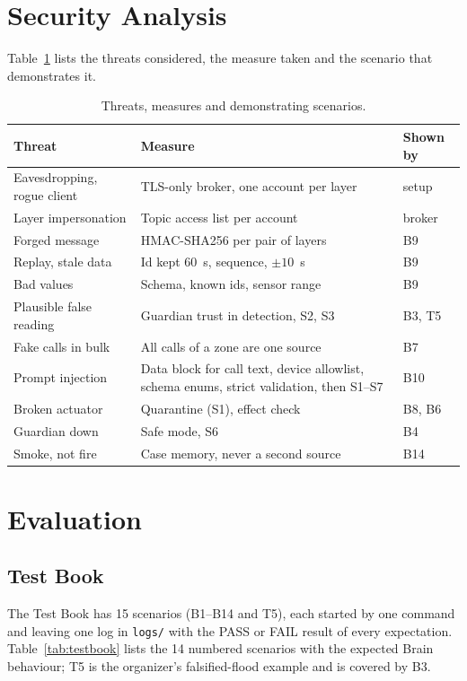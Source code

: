 \documentclass[conference]{IEEEtran}
\newcommand{\code}[1]{\texttt{\small #1}}
\begin{document}
\section{Security Analysis}
Table~\ref{tab:sec} lists the threats considered, the measure taken and the scenario that demonstrates it.

\begin{table}[t]
\centering
\caption{Threats, measures and demonstrating scenarios.}
\label{tab:sec}
\footnotesize
\renewcommand{\arraystretch}{1.05}
\begin{tabular}{@{}p{2.0cm} p{4.3cm} l@{}}
\toprule
\textbf{Threat} & \textbf{Measure} & \textbf{Shown by}\\
\midrule
Eavesdropping, rogue client & TLS-only broker, one account per layer & setup\\
Layer impersonation & Topic access list per account & broker\\
Forged message & HMAC-SHA256 per pair of layers & B9\\
Replay, stale data & Id kept 60~s, sequence, $\pm10$~s & B9\\
Bad values & Schema, known ids, sensor range & B9\\
Plausible false reading & Guardian trust in detection, S2, S3 & B3, T5\\
Fake calls in bulk & All calls of a zone are one source & B7\\
Prompt injection & Data block for call text, device allowlist, schema enums, strict validation, then S1--S7~\cite{injection} & B10\\
Broken actuator & Quarantine (S1), effect check & B8, B6\\
Guardian down & Safe mode, S6 & B4\\
Smoke, not fire & Case memory, never a second source & B14\\
\bottomrule
\end{tabular}
\end{table}

\section{Evaluation}
\subsection{Test Book}
The Test Book has 15 scenarios (B1--B14 and T5), each started by one command and leaving one log in
\code{logs/} with the PASS or FAIL result of every expectation. Table~\ref{tab:testbook} lists the 14 numbered scenarios with
the expected Brain behaviour; T5 is the organizer's falsified-flood example and is covered by B3.
\end{document}
